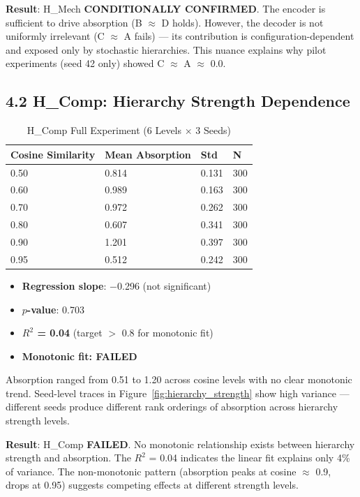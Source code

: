 \documentclass{article}
\begin{document}
\textbf{Result}: H\_Mech \textbf{CONDITIONALLY CONFIRMED}. The encoder is sufficient to drive absorption (B $\approx$ D holds). However, the decoder is not uniformly irrelevant (C $\approx$ A fails) --- its contribution is configuration-dependent and exposed only by stochastic hierarchies. This nuance explains why pilot experiments (seed 42 only) showed C $\approx$ A $\approx$ 0.0.

\subsection{4.2 H\_Comp: Hierarchy Strength Dependence}

\begin{table}[h]
\centering
\caption{H\_Comp Full Experiment (6 Levels $\times$ 3 Seeds)}
\label{tab:h_comp_results}
\begin{tabular}{llll}
\toprule
Cosine Similarity & Mean Absorption & Std & N \\
\midrule
0.50 & 0.814 & 0.131 & 300 \\
0.60 & 0.989 & 0.163 & 300 \\
0.70 & 0.972 & 0.262 & 300 \\
0.80 & 0.607 & 0.341 & 300 \\
0.90 & 1.201 & 0.397 & 300 \\
0.95 & 0.512 & 0.242 & 300 \\
\bottomrule
\end{tabular}
\end{table}

\begin{itemize}
\item \textbf{Regression slope}: $-$0.296 (not significant)
\item \textbf{$p$-value}: 0.703
\item \textbf{$R^2$ = 0.04} (target $>$ 0.8 for monotonic fit)
\item \textbf{Monotonic fit: FAILED}
\end{itemize}

Absorption ranged from 0.51 to 1.20 across cosine levels with no clear monotonic trend. Seed-level traces in Figure~\ref{fig:hierarchy_strength} show high variance --- different seeds produce different rank orderings of absorption across hierarchy strength levels.

\textbf{Result}: H\_Comp \textbf{FAILED}. No monotonic relationship exists between hierarchy strength and absorption. The $R^2$ = 0.04 indicates the linear fit explains only 4\% of variance. The non-monotonic pattern (absorption peaks at cosine $\approx$ 0.9, drops at 0.95) suggests competing effects at different strength levels.
\end{document}
